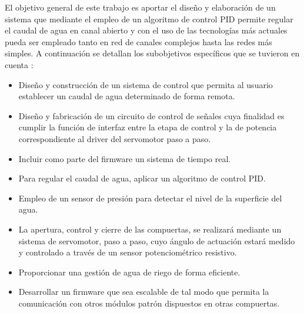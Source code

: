 El objetivo general de este trabajo es aportar el diseño y elaboración de un sistema que mediante el empleo de un algoritmo de control PID permite regular el caudal de agua en canal abierto y con el uso de las tecnologías más actuales pueda ser empleado tanto en red de canales complejos hasta las redes más simples. A continuación se detallan los subobjetivos específicos que se tuvieron en cuenta :  
\begin{itemize}
\item Diseño y construcción de  un sistema de control que permita al usuario establecer un caudal de agua determinado de forma remota.

\item Diseño y fabricación de un circuito de control de señales cuya finalidad es cumplir la función de interfaz entre la etapa de control y la de potencia correspondiente al driver del servomotor paso a paso. 
\item Incluir como parte del firmware un sistema de tiempo real.  
\item Para regular el caudal de agua, aplicar un algoritmo de control PID.
\item Empleo de un sensor de presión para detectar el nivel de la superficie del agua.
\item La apertura, control y cierre de las compuertas, se realizará mediante un sistema de servomotor, paso a paso, cuyo ángulo de actuación estará medido y controlado a través de un sensor potenciométrico resistivo.  
\item Proporcionar una gestión de agua de riego de forma eficiente.
\item Desarrollar un firmware que sea escalable de tal modo que permita la comunicación con otros módulos patrón dispuestos en otras compuertas. 
\end{itemize}

